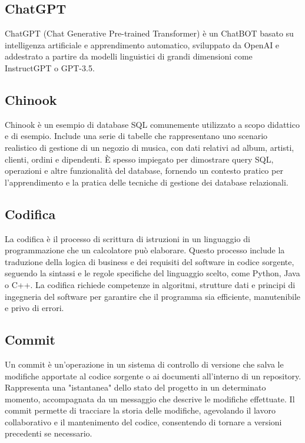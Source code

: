 \vspace{2em}
\subsection*{ChatGPT}
\par ChatGPT (Chat Generative Pre-trained Transformer) è un ChatBOT basato su intelligenza artificiale e apprendimento automatico, sviluppato da OpenAI e addestrato a partire da modelli linguistici di grandi dimensioni come InstructGPT o GPT-3.5.

\vspace{2em}
\subsection*{Chinook}
\par Chinook è un esempio di database SQL comunemente utilizzato a scopo didattico e di esempio. Include una serie di tabelle che rappresentano uno scenario realistico di gestione di un negozio di musica, con dati relativi ad album, artisti, clienti, ordini e dipendenti. È spesso impiegato per dimostrare query SQL, operazioni  e altre funzionalità del database, fornendo un contesto pratico per l'apprendimento e la pratica delle tecniche di gestione dei database relazionali.

\vspace{2em}
\subsection*{Codifica}
\par La codifica è il processo di scrittura di istruzioni in un linguaggio di programmazione che un calcolatore può elaborare. Questo processo include la traduzione della logica di business e dei requisiti del software in codice sorgente, seguendo la sintassi e le regole specifiche del linguaggio scelto, come Python, Java o C++. La codifica richiede competenze in algoritmi, strutture dati e principi di ingegneria del software per garantire che il programma sia efficiente, manutenibile e privo di errori.

\vspace{2em}
\subsection*{Commit}
\par Un commit è un'operazione in un sistema di controllo di versione che salva le modifiche apportate al codice sorgente o ai documenti all'interno di un repository. Rappresenta una "istantanea" dello stato del progetto in un determinato momento, accompagnata da un messaggio che descrive le modifiche effettuate. Il commit permette di tracciare la storia delle modifiche, agevolando il lavoro collaborativo e il mantenimento del codice, consentendo di tornare a versioni precedenti se necessario.


